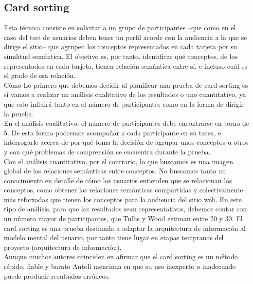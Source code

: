 \subsection{Card sorting}
Esta técnica consiste en solicitar a un grupo de participantes –que como en el caso del test de usuarios deben tener un perfil acorde con la audiencia a la que se dirige el sitio– que agrupen los conceptos representados en cada tarjeta por su similitud semántica. El objetivo es, por tanto, identificar qué conceptos, de los representados en cada tarjeta, tienen relación semántica entre sí, e incluso cuál es el grado de esa relación.\\ 
 Cómo Lo primero que debemos decidir al planificar una prueba de card sorting es si vamos a realizar un análisis cualitativo de los resultados o uno cuantitativo, ya que esto influirá tanto en el número de participantes como en la forma de dirigir la prueba.\\
En el análisis cualitativo, el número de participantes debe encontrarse en torno de 5. De esta forma podremos acompañar a cada participante en su tarea, e interrogarle acerca de por qué toma la decisión de agrupar unos conceptos u otros y con qué problemas de comprensión se encuentra durante la prueba.\\
Con el análisis cuantitativo, por el contrario, lo que buscamos es una imagen global de las relaciones semánticas entre conceptos. No buscamos tanto un conocimiento en detalle de cómo los usuarios entienden que se relacionan los conceptos, como obtener las relaciones semánticas compartidas y colectivamente más reforzadas que tienen los conceptos para la audiencia del sitio web. En este tipo de análisis, para que los resultados sean representativos, debemos contar con un número mayor de participantes, que Tullis y Wood estiman entre 20 y 30.
El card sorting es una prueba destinada a adaptar la arquitectura de información al modelo mental del usuario, por tanto tiene lugar en etapas tempranas del proyecto (arquitectura de información).\\
Aunque muchos autores coinciden en afirmar que el card sorting es un método rápido, fiable y barato Antolí menciona en que su uso inexperto o inadecuado puede producir resultados erróneos.
